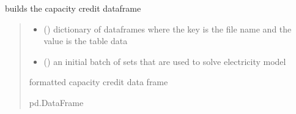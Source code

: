 \documentclass[letterpaper,10pt,english]{sphinxmanual}
\begin{document}
\begin{fulllineitems}
\label{\detokenize{src.models.electricity.scripts.preprocessor:src.models.electricity.scripts.preprocessor.capacitycredit_df}}
\pysigstartsignatures
\pysiglinewithargsret
{}
{\sphinxparamcomma {}}
{}
\pysigstopsignatures
\sphinxAtStartPar
builds the capacity credit dataframe
\begin{quote}\begin{description}
\begin{itemize}
\item {} 
\sphinxAtStartPar
{} () \textendash{} dictionary of dataframes where the key is the file name and the value is the table data

\item {} 
\sphinxAtStartPar
{} ({\hyperref[\detokenize{src.models.electricity.scripts.preprocessor:src.models.electricity.scripts.preprocessor.Sets}]{}}) \textendash{} an initial batch of sets that are used to solve electricity model

\end{itemize}

\sphinxAtStartPar
formatted capacity credit data frame

\sphinxAtStartPar
pd.DataFrame

\end{description}\end{quote}

\end{fulllineitems}

\end{document}
